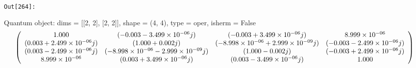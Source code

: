 \documentclass[11pt]{article}
\begin{document}
\texttt{\color{outcolor}Out[{\color{outcolor}264}]:}
    
    Quantum object: dims = [[2, 2], [2, 2]], shape = (4, 4), type = oper, isherm = False\begin{equation*}\left(\begin{array}{*{11}c}1.000 & (-0.003-3.499\times10^{-06}j) & (-0.003+3.499\times10^{-06}j) & 8.999\times10^{-06}\\(0.003+2.499\times10^{-06}j) & (1.000+0.002j) & (-8.998\times10^{-06}+2.999\times10^{-09}j) & (-0.003-2.499\times10^{-06}j)\\(0.003-2.499\times10^{-06}j) & (-8.998\times10^{-06}-2.999\times10^{-09}j) & (1.000-0.002j) & (-0.003+2.499\times10^{-06}j)\\8.999\times10^{-06} & (0.003+3.499\times10^{-06}j) & (0.003-3.499\times10^{-06}j) & 1.000\\\end{array}\right)\end{equation*}

    
\end{document}
